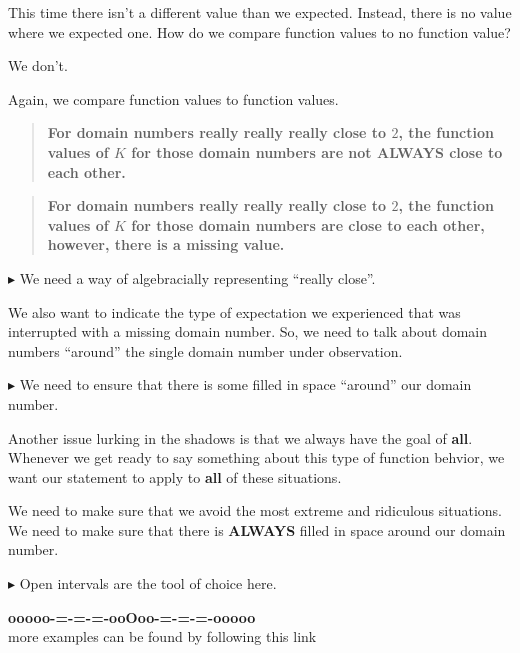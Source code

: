 \documentclass{ximera}
\begin{document}
This time there isn't a different value than we expected.  Instead, there is no value where we expected one. How do we compare function values to no function value? 

We don't.

Again, we compare function values to function values. 


\begin{quote}
 \textbf{\textcolor{blue!55!black}{For domain numbers really really really close to $2$, the function values of $K$ for those domain numbers are not ALWAYS close to each other.}} 
\end{quote}


\begin{quote}
 \textbf{\textcolor{blue!55!black}{For domain numbers really really really close to $2$, the function values of $K$ for those domain numbers are close to each other, however, there is a missing value.}} 
\end{quote}




\textbf{\textcolor{red!70!darkgray}{$\blacktriangleright$}} We need a way of algebracially representing ``really close''.  


We also want to indicate the type of expectation we experienced that was interrupted with a missing domain number. So, we need to talk about domain numbers ``around'' the single domain number under observation. 


\textbf{\textcolor{red!70!darkgray}{$\blacktriangleright$}} We need to ensure that there is some filled in space ``around'' our domain number. 





Another issue lurking in the shadows is that we always have the goal of \textbf{\textcolor{red!70!black}{all}}. Whenever we get ready to say something about this type of function behvior, we want our statement to apply to \textbf{\textcolor{red!70!black}{all}} of these situations. 

We need to make sure that we avoid the most extreme and ridiculous situations.  We need to make sure that there is \textbf{\textcolor{red!70!black}{ALWAYS}} filled in space around our domain number.




\textbf{\textcolor{red!70!darkgray}{$\blacktriangleright$}} Open intervals are the tool of choice here.














\begin{center}
\textbf{\textcolor{green!50!black}{ooooo-=-=-=-ooOoo-=-=-=-ooooo}} \\

more examples can be found by following this link\\ 

\end{center}
\end{document}

